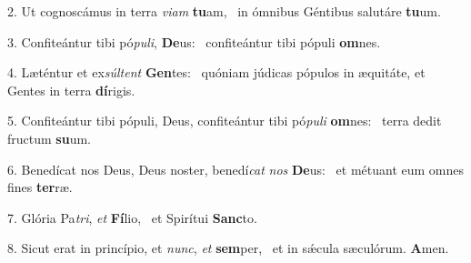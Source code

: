 2. Ut cognoscámus in terra \textit{vi}\textit{am} \textbf{tu}am, \ast\  in ómnibus Géntibus salutáre \textbf{tu}um.\

3. Confiteántur tibi pó\textit{pu}\textit{li}, \textbf{De}us: \ast\  confiteántur tibi pópuli \textbf{om}nes.\

4. Læténtur et ex\textit{súl}\textit{tent} \textbf{Gen}tes: \ast\  quóniam júdicas pópulos in æquitáte, et Gentes in terra \textbf{dí}rigis.\

5. Confiteántur tibi pópuli, Deus, confiteántur tibi pó\textit{pu}\textit{li} \textbf{om}nes: \ast\  terra dedit fructum \textbf{su}um.\

6. Benedícat nos Deus, Deus noster, benedí\textit{cat} \textit{nos} \textbf{De}us: \ast\  et métuant eum omnes fines \textbf{ter}ræ.\

7. Glória Pa\textit{tri}, \textit{et} \textbf{Fí}lio, \ast\  et Spirítui \textbf{Sanc}to.\

8. Sicut erat in princípio, et \textit{nunc}, \textit{et} \textbf{sem}per, \ast\  et in sǽcula sæculórum. \textbf{A}men.\

